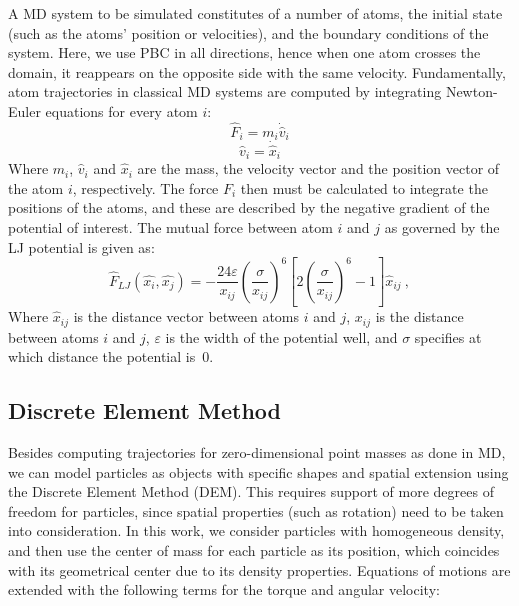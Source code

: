 \documentclass[Afour,sageh,times]{sagej}
\begin{document}
A \ac{MD} system to be simulated constitutes of a number of atoms, the initial state (such as the atoms' position or velocities), and the boundary conditions of the system.
Here, we use \ac{PBC} in all directions, hence when one atom crosses the domain, it reappears on the opposite side with the same velocity.
Fundamentally, atom trajectories in classical \ac{MD} systems are computed by integrating Newton-Euler equations for every atom $i$:
\begin{equation}
    \hat F_i = m_i \dot{\hat v}_i \label{eq:newton_force}
\end{equation}
\begin{equation}
    \hat v_i = \dot{\hat x}_i \label{eq:newton_velocity}
\end{equation}
Where $m_i$, $\hat v_i$ and $\hat x_i$ are the mass, the velocity vector and the position vector of the atom $i$, respectively.
The force $F_i$ then must be calculated to integrate the positions of the atoms, and these are described by the negative gradient of the potential of interest.
The mutual force between atom $i$ and $j$ as governed by the \ac{LJ} potential
is given as:
\begin{equation}
    \hat{F}_{LJ}(\hat{x_i}, \hat{x_j}) = -\frac{24\varepsilon}{x_{ij}} \left( \frac{\sigma}{x_{ij}} \right)^{6} \left[ 2\left(\frac{\sigma}{x_{ij}}\right)^{6} - 1\right] \hat{x}_{ij}~,
    \label{eq:lennard_jones}
\end{equation}
Where $\hat{x}_{ij}$ is the distance vector between atoms $i$ and $j$, $x_{ij}$ is the distance between atoms $i$ and $j$, $\varepsilon$ is the width of the potential well, and $\sigma$ specifies at which distance the potential is~$0$.

\subsection{Discrete Element Method}
\label{sec:dem}

Besides computing trajectories for zero-dimensional point masses as done in MD, we can model particles as objects with specific shapes and spatial extension using the Discrete Element Method (DEM).
This requires support of more degrees of freedom for particles, since spatial properties (such as rotation) need to be taken into consideration.
In this work, we consider particles with homogeneous density, and then use the center of mass for each particle as its position, which coincides with its geometrical center due to its density properties.
Equations of motions are extended with the following terms for the torque and angular velocity:
\end{document}
